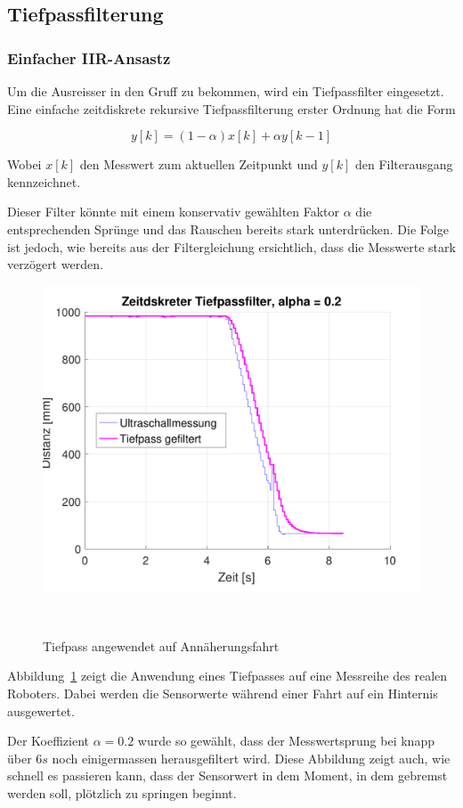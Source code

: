 \documentclass[main.tex]{subfiles} %
\begin{document}
\subsection*{Tiefpassfilterung}

\subsubsection*{Einfacher IIR-Ansastz}

Um die Ausreisser in den Gruff zu bekommen, wird ein Tiefpassfilter eingesetzt.
Eine einfache zeitdiskrete rekursive Tiefpassfilterung erster Ordnung hat die
Form

\[
    y[k] = (1 - \alpha) x[k] + \alpha y[k - 1]
\]

Wobei $x[k]$ den Messwert zum aktuellen Zeitpunkt und $y[k]$ den Filterausgang
kennzeichnet.

Dieser Filter könnte mit einem konservativ gewählten Faktor $\alpha$ die
entsprechenden Sprünge und das Rauschen bereits stark unterdrücken. Die Folge
ist jedoch, wie bereits aus der Filtergleichung ersichtlich, dass die Messwerte
stark verzögert werden.

\begin{figure}[H]
    \centering
    \includegraphics[width=0.5\linewidth]{./fig_Parametrierung_HcSr04/Einfacher_Tiefpass_HcSr04.pdf}
    \caption{Tiefpass angewendet auf Annäherungsfahrt}~\label{fig:EinfacherTiefpassHcSr04}
\end{figure}

Abbildung~\ref{fig:EinfacherTiefpassHcSr04} zeigt die Anwendung eines
Tiefpasses auf eine Messreihe des realen Roboters. Dabei werden die Sensorwerte
während einer Fahrt auf ein Hinternis ausgewertet.

Der Koeffizient $\alpha = 0.2$ wurde so gewählt, dass der Messwertsprung bei
knapp über $6s$ noch einigermassen herausgefiltert wird. Diese Abbildung zeigt
auch, wie schnell es passieren kann, dass der Sensorwert in dem Moment, in dem
gebremst werden soll, plötzlich zu springen beginnt.
\end{document}
